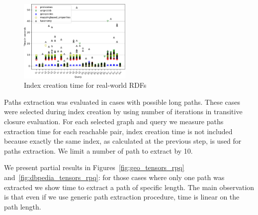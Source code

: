 \begin{figure}
   \includegraphics[width=0.48\textwidth]{data/other_all.pdf}
   \caption{Index creation time for real-world RDFs}
   \label{fig:other_all_qs}
\end{figure}

Paths extraction was evaluated in cases with possible long paths.
These cases were selected during index creation by using number of iterations in transitive closure evaluation.
For each selected graph and query we measure paths extraction time for each reachable pair, index creation time is not included because exactly the same index, as calculated at the previous step, is used for paths extraction. 
We limit a number of path to extract by 10.

We present partial results in Figures~\ref{fig:geo_tensors_rpq} and~\ref{fig:dbpedia_tensors_rpq}: for those cases where only one path was extracted we show time to extract a path of specific length.
The main observation is that even if we use generic path extraction procedure, time is linear on the path length. 


